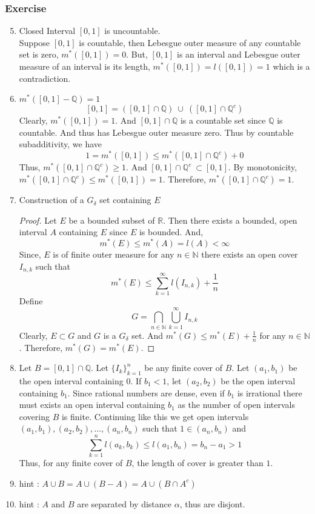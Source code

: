 \subsubsection{Exercise}
\begin{enumerate}
	\setcounter{enumi}{4}
\item Closed Interval $[0,1]$ is uncountable.\\
	Suppose $[0,1]$ is countable, then Lebesgue outer measure of any countable set is zero, $m^\ast([0,1]) = 0$.
		But, $[0,1]$ is an interval and Lebesgue outer measure of an interval is its length, $m^\ast([0,1]) = l([0,1]) = 1$ which is a contradiction.
\item $m^\ast([0,1] - \mathbb{Q}) = 1$
	\[ [0,1] = \left( [0,1] \cap \mathbb{Q} \right)\ \cup\ \left( [0,1]\cap \mathbb{Q}^c \right) \]
	Clearly, $m^\ast([0,1]) = 1$.
		And $[0,1] \cap \mathbb{Q}$ is a countable set since $\mathbb{Q}$ is countable.
		And thus has Lebesgue outer measure zero.
		Thus by countable subadditivity, we have
		\[ 1 = m^\ast([0,1]) \le m^\ast([0,1] \cap \mathbb{Q}^c) + 0 \]
		Thus, $m^\ast([0,1] \cap \mathbb{Q}^c) \ge 1$.
		And $[0,1] \cap \mathbb{Q}^c\ \subset [0,1]$.
		By monotonicity, $m^\ast([0,1] \cap \mathbb{Q}^c) \le m^\ast([0,1]) = 1$.
		Therefore, $m^\ast([0,1] \cap \mathbb{Q}^c) = 1$.
	\item Construction of a $G_\delta$ set containing $E$
		\begin{proof}
			Let $E$ be a bounded subset of $\mathbb{R}$.
			Then there exists a bounded, open interval $A$ containing $E$ since $E$ is bounded.
			And,
			\[ m^\ast(E) \le m^\ast(A) = l(A) < \infty \]
			Since, $E$ is of finite outer measure for any $n \in \mathbb{N}$ there exists an open cover $I_{n,k}$ such that
			\[ m^\ast(E) \le \sum_{k=1}^\infty l(I_{n,k}) + \frac{1}{n} \]
			Define
			\[ G = \bigcap_{n \in \mathbb{N}} \bigcup_{k=1}^\infty I_{n,k} \]
			Clearly, $E \subset G$ and $G$ is a $G_\delta$ set.
			And $m^\ast(G) \le m^\ast(E) + \frac{1}{n}$ for any $n \in \mathbb{N}$.
			Therefore, $m^\ast(G) = m^\ast(E)$.
		\end{proof}
	\item 
		Let $B = [0,1]\cap \mathbb{Q}$.
		Let $\{I_k\}_{k=1}^n$ be any finite cover of $B$.
		Let $(a_1,b_1)$ be the open interval containing $0$.
		If $b_1 < 1$, let $(a_2,b_2)$ be the open interval containing $b_1$.
		Since rational numbers are dense, even if $b_1$ is irrational there must exists an open interval containing $b_1$ as the number of open intervals covering $B$ is finite.
		Continuing like this we get open intervals $(a_1,b_1),(a_2,b_2),\dots,(a_n,b_n)$ such that $1 \in (a_n,b_n)$ and
		\[ \sum_{k=1}^n l(a_k,b_k) \le l(a_1,b_n) = b_n-a_1 > 1 \]
		Thus, for any finite cover of $B$, the length of cover is greater than $1$.
	\item hint : $A \cup B = A \cup (B-A) = A \cup (B \cap A^c)$
	\item hint : $A$ and $B$ are separated by distance $\alpha$, thus are disjont.
\end{enumerate}

